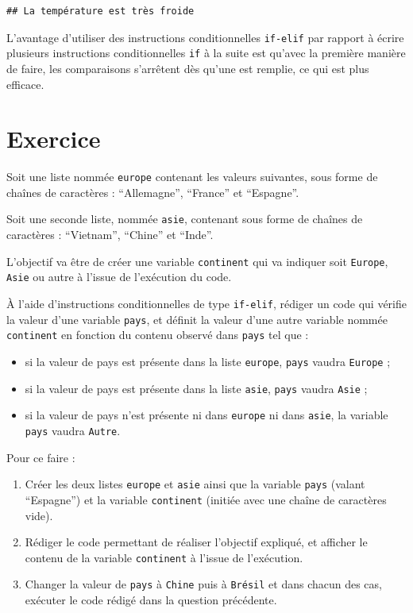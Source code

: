 \documentclass[12pt,]{book}
\providecommand{\tightlist}{%
  \setlength{\itemsep}{0pt}\setlength{\parskip}{0pt}}
\numberwithin{equation}{section}
\numberwithin{countremarque}{section}
\let\BeginKnitrBlock\begin \let\EndKnitrBlock\end
\begin{document}
\begin{lstlisting}
## La température est très froide
\end{lstlisting}

\BeginKnitrBlock{remarque}
L'avantage d'utiliser des instructions conditionnelles \texttt{if-elif}
par rapport à écrire plusieurs instructions conditionnelles \texttt{if}
à la suite est qu'avec la première manière de faire, les comparaisons
s'arrêtent dès qu'une est remplie, ce qui est plus efficace.
\EndKnitrBlock{remarque}

\section{Exercice}\label{exercice-4}

\BeginKnitrBlock{exframe}
Soit une liste nommée \texttt{europe} contenant les valeurs suivantes,
sous forme de chaînes de caractères : ``Allemagne'', ``France'' et
``Espagne''.

Soit une seconde liste, nommée \texttt{asie}, contenant sous forme de
chaînes de caractères : ``Vietnam'', ``Chine'' et ``Inde''.

L'objectif va être de créer une variable \texttt{continent} qui va
indiquer soit \texttt{Europe}, \texttt{Asie} ou autre à l'issue de
l'exécution du code.

À l'aide d'instructions conditionnelles de type \texttt{if-elif},
rédiger un code qui vérifie la valeur d'une variable \texttt{pays}, et
définit la valeur d'une autre variable nommée \texttt{continent} en
fonction du contenu observé dans \texttt{pays} tel que :

\begin{itemize}
\tightlist
\item
  si la valeur de pays est présente dans la liste \texttt{europe},
  \texttt{pays} vaudra \texttt{Europe} ;
\item
  si la valeur de pays est présente dans la liste \texttt{asie},
  \texttt{pays} vaudra \texttt{Asie} ;
\item
  si la valeur de pays n'est présente ni dans \texttt{europe} ni dans
  \texttt{asie}, la variable \texttt{pays} vaudra \texttt{Autre}.
\end{itemize}

Pour ce faire :

\begin{enumerate}
\def\labelenumi{\arabic{enumi}.}
\tightlist
\item
  Créer les deux listes \texttt{europe} et \texttt{asie} ainsi que la
  variable \texttt{pays} (valant ``Espagne'') et la variable
  \texttt{continent} (initiée avec une chaîne de caractères vide).
\item
  Rédiger le code permettant de réaliser l'objectif expliqué, et
  afficher le contenu de la variable \texttt{continent} à l'issue de
  l'exécution.
\item
  Changer la valeur de \texttt{pays} à \texttt{Chine} puis à
  \texttt{Brésil} et dans chacun des cas, exécuter le code rédigé dans
  la question précédente.
\end{enumerate}
\EndKnitrBlock{exframe}
\end{document}
